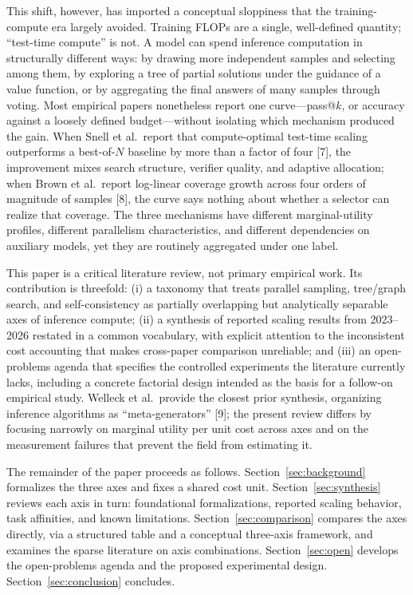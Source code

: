 \documentclass[10pt]{article}
\begin{document}
This shift, however, has imported a conceptual sloppiness that the training-compute era largely avoided. Training FLOPs are a single, well-defined quantity; ``test-time compute'' is not. A model can spend inference computation in structurally different ways: by drawing more independent samples and selecting among them, by exploring a tree of partial solutions under the guidance of a value function, or by aggregating the final answers of many samples through voting. Most empirical papers nonetheless report one curve---pass@$k$, or accuracy against a loosely defined budget---without isolating which mechanism produced the gain. When Snell et al.\ report that compute-optimal test-time scaling outperforms a best-of-$N$ baseline by more than a factor of four [7], the improvement mixes search structure, verifier quality, and adaptive allocation; when Brown et al.\ report log-linear coverage growth across four orders of magnitude of samples [8], the curve says nothing about whether a selector can realize that coverage. The three mechanisms have different marginal-utility profiles, different parallelism characteristics, and different dependencies on auxiliary models, yet they are routinely aggregated under one label.

This paper is a critical literature review, not primary empirical work. Its contribution is threefold: (i) a taxonomy that treats parallel sampling, tree/graph search, and self-consistency as partially overlapping but analytically separable axes of inference compute; (ii) a synthesis of reported scaling results from 2023--2026 restated in a common vocabulary, with explicit attention to the inconsistent cost accounting that makes cross-paper comparison unreliable; and (iii) an open-problems agenda that specifies the controlled experiments the literature currently lacks, including a concrete factorial design intended as the basis for a follow-on empirical study. Welleck et al.\ provide the closest prior synthesis, organizing inference algorithms as ``meta-generators'' [9]; the present review differs by focusing narrowly on marginal utility per unit cost across axes and on the measurement failures that prevent the field from estimating it.

The remainder of the paper proceeds as follows. Section~\ref{sec:background} formalizes the three axes and fixes a shared cost unit. Section~\ref{sec:synthesis} reviews each axis in turn: foundational formalizations, reported scaling behavior, task affinities, and known limitations. Section~\ref{sec:comparison} compares the axes directly, via a structured table and a conceptual three-axis framework, and examines the sparse literature on axis combinations. Section~\ref{sec:open} develops the open-problems agenda and the proposed experimental design. Section~\ref{sec:conclusion} concludes.
\end{document}
